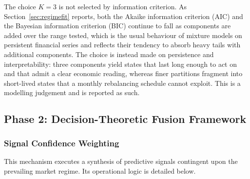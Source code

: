 \documentclass{singlecol-new}
\theoremstyle{TH}{
\newtheorem{lemma}{Lemma}
\newtheorem{theorem}[lemma]{Theorem}
\newtheorem{corrolary}[lemma]{Corrolary}
\newtheorem{conjecture}[lemma]{Conjecture}
\newtheorem{proposition}[lemma]{Proposition}
\newtheorem{claim}[lemma]{Claim}
\newtheorem{stheorem}[lemma]{Wrong Theorem}
\newtheorem{algorithm}{Algorithm}
}
\theoremstyle{THrm}{
\newtheorem{definition}{Definition}[section]
\newtheorem{question}{Question}[section]
\newtheorem{remark}{Remark}
\newtheorem{scheme}{Scheme}
}
\theoremstyle{THhit}{
\newtheorem{case}{Case}[section]
}
\begin{document}
The choice $K = 3$ is not selected by information criterion. As
Section~\ref{sec:regimefit} reports, both the Akaike information criterion (AIC) and the
Bayesian information criterion (BIC) continue to fall as components are added over the
range tested, which is the usual behaviour of mixture models on persistent financial
series and reflects their tendency to absorb heavy tails with additional components. The
choice is instead made on persistence and interpretability: three components yield states
that last long enough to act on and that admit a clear economic reading, whereas finer
partitions fragment into short-lived states that a monthly rebalancing schedule cannot
exploit. This is a modelling judgement and is reported as such.

\subsection{Phase 2: Decision-Theoretic Fusion Framework}

\subsubsection{Signal Confidence Weighting}

This mechanism executes a synthesis of predictive signals contingent upon the prevailing
market regime. Its operational logic is detailed below.
\end{document}

